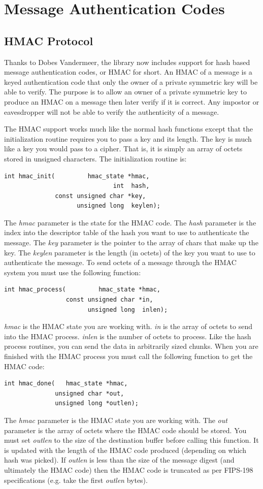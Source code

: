 \documentclass[synpaper]{book}
\newcommand{\mysection}[1]    %
	{                   %
	\section{#1}
   \markboth{\textsf{www.libtom.net}}{\thesection ~ {#1}}
	}
\begin{document}
\chapter{Message Authentication Codes}
\mysection{HMAC Protocol}
Thanks to Dobes Vandermeer, the library now includes support for hash based message authentication codes, or HMAC for short.  An HMAC
of a message is a keyed authentication code that only the owner of a private symmetric key will be able to verify.  The purpose is
to allow an owner of a private symmetric key to produce an HMAC on a message then later verify if it is correct.  Any impostor or
eavesdropper will not be able to verify the authenticity of a message.

The HMAC support works much like the normal hash functions except that the initialization routine requires you to pass a key
and its length.  The key is much like a key you would pass to a cipher.  That is, it is simply an array of octets stored in
unsigned characters.  The initialization routine is:
\begin{verbatim}
int hmac_init(         hmac_state *hmac,
                              int  hash,
              const unsigned char *key,
                    unsigned long  keylen);
\end{verbatim}
The \textit{hmac} parameter is the state for the HMAC code.  The \textit{hash} parameter is the index into the descriptor table of the hash you want
to use to authenticate the message.  The \textit{key} parameter is the pointer to the array of chars that make up the key.  The \textit{keylen} parameter is the
length (in octets) of the key you want to use to authenticate the message.  To send octets of a message through the HMAC system you must use the following function:
\begin{verbatim}
int hmac_process(         hmac_state *hmac,
                 const unsigned char *in,
                       unsigned long  inlen);
\end{verbatim}
\textit{hmac} is the HMAC state you are working with. \textit{in} is the array of octets to send into the HMAC process.  \textit{inlen} is the
number of octets to process.  Like the hash process routines, you can send the data in arbitrarily sized chunks. When you
are finished with the HMAC process you must call the following function to get the HMAC code:
\begin{verbatim}
int hmac_done(   hmac_state *hmac,
              unsigned char *out,
              unsigned long *outlen);
\end{verbatim}
The \textit{hmac} parameter is the HMAC state you are working with.  The \textit{out} parameter is the array of octets where the HMAC code should be stored.
You must set \textit{outlen} to the size of the destination buffer before calling this function.  It is updated with the length of the HMAC code
produced (depending on which hash was picked).  If \textit{outlen} is less than the size of the message digest (and ultimately
the HMAC code) then the HMAC code is truncated as per FIPS-198 specifications (e.g. take the first \textit{outlen} bytes).
\end{document}
